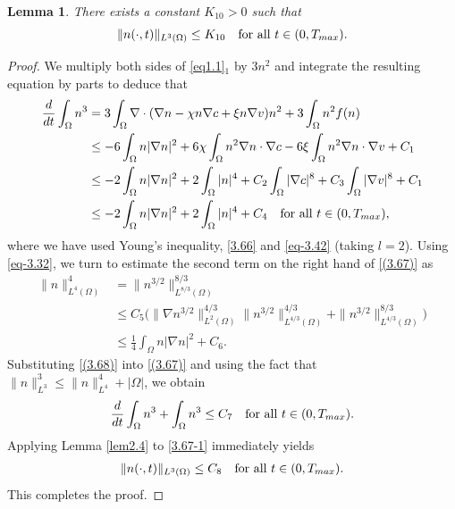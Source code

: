 \documentclass[10pt,a4paper]{amsart}
\numberwithin{equation}{section}
\newtheorem{lemma}[theo]{Lemma}
\begin{document}
\begin{lemma}\label{lem3.9}
There exists a constant $K_{10}> 0 $ such that
\begin{equation}\label{9.12-7}
\|n(\cdot,t)\|_{L^3(\Omega)} \leq K_{10} \quad \text{for all } t \in (0, T_{\rm max}).
\end{equation}
\end{lemma}

\begin{proof} 
We multiply both sides of \eqref{eq1.1}$_1$ by $3n^2$ and integrate the resulting 
equation by parts to deduce that
\begin{equation}\label{(3.67)}
\begin{aligned}
\frac{d}{dt} \int_{\Omega} n^3 &= 3 \int_{\Omega} \nabla 
 \cdot  ( \nabla n - \chi n \nabla c + \xi n \nabla v) n^2 
 + 3 \int_{\Omega} n^2 f(n) \\
&\leq -6 \int_{\Omega} n |\nabla n|^2 + 6\chi \int_{\Omega} n^2 \nabla n 
\cdot \nabla c -6\xi \int_{\Omega} n^2 \nabla n \cdot \nabla v + C_1 \\
&\leq -2 \int_{\Omega} n |\nabla n|^2 + 2\int_{\Omega} |n|^4 
 + C_2 \int_{\Omega} |\nabla c|^8 + C_3 \int_{\Omega} |\nabla v|^8 + C_1 \\
&\leq -2 \int_{\Omega} n |\nabla n|^2 + 2\int_{\Omega} |n|^4 
 + C_4 \quad \text{for all } t \in (0, T_{\rm max}),
\end{aligned}
\end{equation}
where we have used Young's inequality, \eqref{3.66}  and \eqref{eq-3.42} 
(taking $l = 2$). Using \eqref{eq-3.32}, we turn to estimate the second term on
the right hand of \eqref{(3.67)} as
\begin{equation}\label{(3.68)}
\begin{aligned}
\| n \|_{L^4(\Omega)}^4
&= \| n^{3/2} \|_{L^{8/3}(\Omega)}^{8/3}\\
&\leq C_5\Big( \| \nabla n^{3/2} \|_{L^2(\Omega)}^{4/3} \|
 n^{3/2} \|_{L^{4/3}(\Omega)}^{4/3}
+ \| n^{3/2} \|_{L^{4/3}(\Omega)}^{8/3}\Big) \\
&\leq \frac{1}{4}\int_{\Omega} n |\nabla n|^2 + C_6.
\end{aligned}
\end{equation}
Substituting \eqref{(3.68)} into \eqref{(3.67)} and using the fact that 
$\|n\|^3_{L^3}\leq \|n\|^4_{L^4}+|\Omega|$, we obtain
\begin{equation}\label{3.67-1}
\begin{aligned}
\frac{d}{dt} \int_{\Omega} n^3 +\int_{\Omega} n^3\leq C_7  \quad \text{for all } 
t \in (0, T_{\rm max}).
\end{aligned}
\end{equation}
Applying Lemma \ref{lem2.4} to \eqref{3.67-1} immediately yields 
\begin{equation}\label{(3.69)}
\begin{aligned}
\| n(\cdot, t) \|_{L^3(\Omega)} \leq C_8 \quad \text{for all } t \in (0, T_{\rm max}).
\end{aligned}
\end{equation}
This completes the proof. 
\end{proof}
\end{document}
